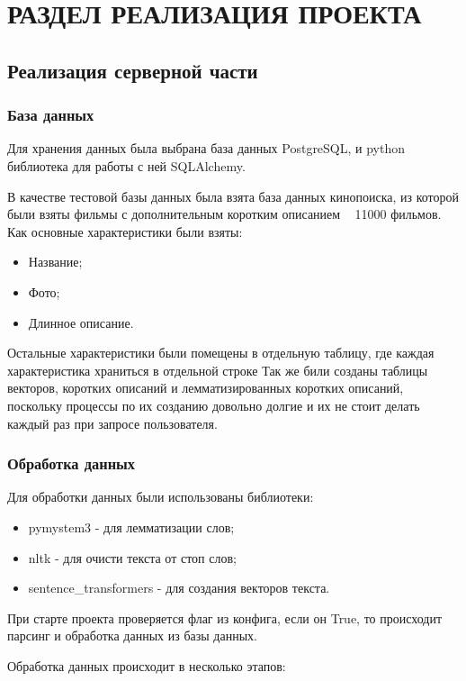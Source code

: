 \chapter{РАЗДЕЛ РЕАЛИЗАЦИЯ ПРОЕКТА}

\section{Реализация серверной части}

\subsection{База данных}
Для хранения данных была выбрана база данных PostgreSQL, и python библиотека для работы с ней SQLAlchemy.

В качестве тестовой базы данных была взята база данных кинопоиска, из которой были взяты фильмы с дополнительным коротким
описанием ~ 11000 фильмов.
Как основные характеристики были взяты:
\begin{itemize}
	\item Название;
	\item Фото;
	\item Длинное описание.
\end{itemize}

Остальные характеристики были помещены в отдельную таблицу, где каждая характеристика храниться в отдельной строке
Так же били созданы таблицы векторов, коротких описаний и лемматизированных коротких описаний, поскольку процессы по их
созданию довольно долгие и их не стоит делать каждый раз при запросе пользователя.

\subsection{Обработка данных}
Для обработки данных были использованы библиотеки:

\begin{itemize}
	\item pymystem3 - для лемматизации слов;
	\item nltk - для очисти текста от стоп слов;
	\item sentence\_transformers - для создания векторов текста.
\end{itemize}

При старте проекта проверяется флаг из конфига, если он True, то происходит парсинг и обработка данных из базы данных.

Обработка данных происходит в несколько этапов:

